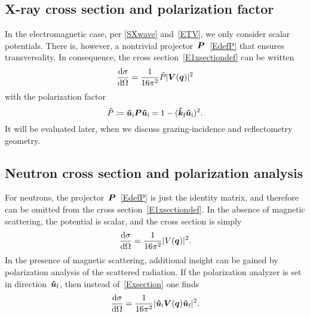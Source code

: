\subsection{X-ray cross section and polarization factor}\label{Spolfac}

In the electromagnetic case,
per \cref{SXwave} and~\cref{ETV},
we only consider scalar potentials.
There is, however, a nontrivial projector~$\bm{P}$~\cref{EdefP}
that ensures transversality.
In consequence, the cross section~\cref{E1xsectiondef} can be written
\begin{equation}\label{ExsectionX}
  \xElas
  = \frac{1}{16\pi^2} \tilde{P} |\TV(\v{q})|^2
\end{equation}
with the polarization factor
\begin{equation}
  \tilde{P}
  \coloneqq \bm{\hat u}_{\text{i}}\bm{P}\bm{\hat u}_{\text{i}}
  = 1 - (\bm{\hat k}_{\text{f}}\bm{\hat u}_{\text{i}})^2.
\end{equation}
It will be evaluated later, %
when we discuss grazing-incidence and reflectometry geometry.

\subsection{Neutron cross section and polarization analysis}\label{Spolan}

For neutrons, the projector~$\bm{P}$~\cref{EdefP}
is just the identity matrix,
and therefore can be omitted from the cross section~\cref{E1xsectiondef}.
In the absence of magnetic scattering, the potential is scalar,
and the cross section is simply
\begin{equation}\label{ExsectionN}
  \xElas
  = \frac{1}{16\pi^2} |V(\v{q})|^2.
\end{equation}
In the presence of magnetic scattering,
additional insight can be gained by polarization analysis of the scattered radiation.
If the polarization analyzer is set in direction~${\bm{\hat u}}_{\text{f}}$,
then instead of~\cref{Exsection} one finds
\begin{equation}\label{ExsectionN}
  \xElas
  = \frac{1}{16\pi^2} |\hu_\si \TV(\v{q})\hu_\sf|^2.
\end{equation}

